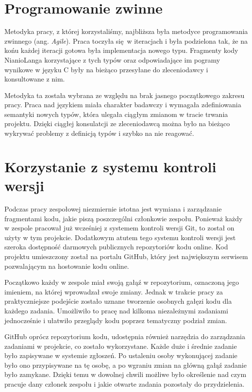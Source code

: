 \documentclass[licencjacka]{pracamgr}
\begin{document}
\section{Programowanie zwinne}
Metodyka pracy, z której korzystaliśmy, najbliższa była metodyce programowania zwinnego (ang. \textit{Agile}).
Praca toczyła się w iteracjach i była podzielona tak, że na końu każdej iteracji gotowa była implementacja
nowego typu. Fragmenty kody NianioLanga korzystające z tych typów oraz odpowiadające im pogramy wynikowe w języku
C były na bieżąco przesyłane do zleceniodawcy i konsultowane z nim.

Metodyka ta została wybrana ze względu na brak jasnego początkowego zakresu pracy.
Praca nad językiem miała charakter badawczy i wymagała zdefiniowania semantyki nowych typów,
która ulegała ciągłym zmianom w tracie trwania projektu.
Dzięki ciągłej konsulatcji ze zleceniodawcą można było na bieżąco wykrywać problemy z definicją typów
i szybko na nie reagować.


\section{Korzystanie z systemu kontroli wersji}
Podczas pracy zespołowej niezmiernie istotna jest wymiana i zarządzanie fragmentami kodu,
jakie piszą poszczególni członkowie zespołu. Ponieważ każdy w zespole pracował już
wcześniej z systemem kontroli wersji Git, to został on użyty w tym projekcie.
Dodatkowym atutem tego systemu kontroli wersji jest szeroka dostępność darmowych
publicznych repozytoriów kodu online. Kod projektu umieszczony został na portalu
GitHub, który jest największym serwisem pozwalającym na hostowanie kodu online.

Początkowo każdy w zespole miał swoją gałąź w repozytorium, oznaczoną jego imieniem,
na której wprowadzał swoje zmiany. Jednak w trakcie pracy za praktyczniejsze podejście
zostało uznane tworzenie osobnych gałęzi kodu dla każdego zadania.
Umożliwiło to pracę nad kilkoma niezależnymi zadaniami jednocześnie i ułatwiło
przeglądy kodu poprzez tematyczny podział zmian.

GitHub oprócz repozytorium kodu, udostępnia również narzędzia do zarządzania zadaniami
w projekcie, co zostało wykorzystane. Każde duże i średnie zadanie było zapisywane
w systemie zgłoszeń. Po ustaleniu osoby wykonującej zadanie było ono przypisywane
na tę osobę, a po wgraniu zmian na główną gałąź zadanie było zamykane.
Dzięki temu w dowolnej chwili możliwe było określenie nad czym pracuje dany członek
zespołu i jakie otwarte zadania pozostały do przydzielenia.
\end{document}
